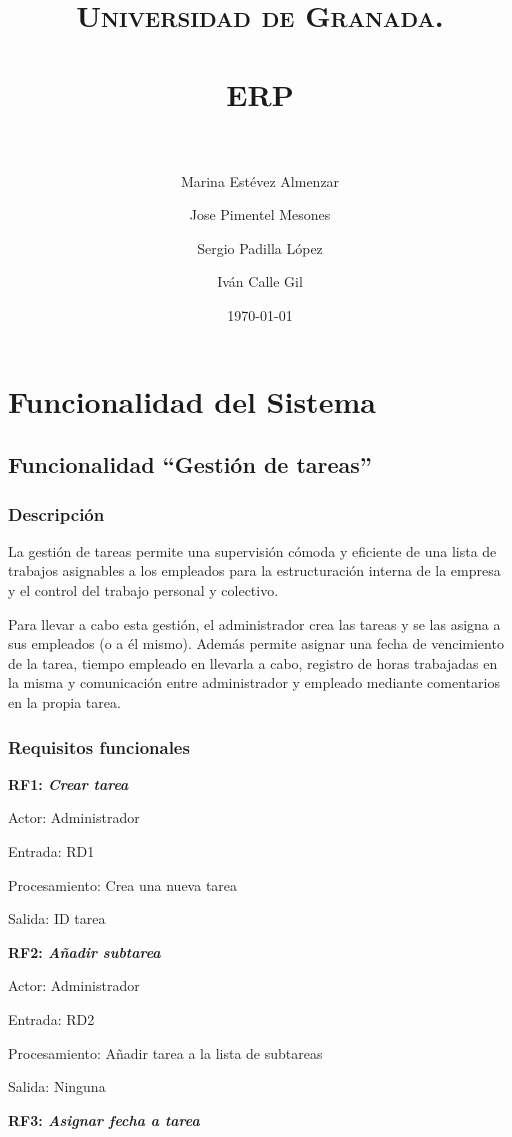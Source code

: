 \documentclass[paper=a4, fontsize=11pt, spanish]{scrartcl}
\title{
  \normalfont \normalsize
  \textsc{Universidad de Granada.} \\ [25pt]
  \horrule{0.5pt} \\[0.4cm]
  \huge ERP \\
  \horrule{2pt} \\[0.5cm]
}
\author{Marina Estévez Almenzar\\
\and
Jose Pimentel Mesones\\
\and
Sergio Padilla López\\
\and
Iván Calle Gil\\}
\date{\normalsize\today}
\begin{document}
\maketitle
\newpage

\section{Funcionalidad del Sistema}

\subsection{Funcionalidad “Gestión de tareas”}

\subsubsection{Descripción}
\setlength{\parindent}{3em} La gestión de tareas permite una supervisión cómoda y eficiente de una lista de trabajos asignables a los empleados para la estructuración interna de la empresa y el control del trabajo personal y colectivo.

	Para llevar a cabo esta gestión, el administrador crea las tareas y se las asigna a sus empleados (o a él mismo). Además permite asignar una fecha de vencimiento de la tarea, tiempo empleado en llevarla a cabo, registro de horas trabajadas en la misma y comunicación entre administrador y empleado mediante comentarios en la propia tarea.

\subsubsection{Requisitos funcionales}
\setlength{\parindent}{0em}
\textbf{RF1: \textit{Crear tarea}}
\setlength{\parindent}{2em}

Actor: Administrador

Entrada: RD1

Procesamiento: Crea una nueva tarea

Salida: ID tarea

\setlength{\parindent}{0em}
\textbf{RF2: \textit{Añadir subtarea}}
\setlength{\parindent}{2em}

Actor: Administrador

Entrada: RD2

Procesamiento: Añadir tarea a la lista de subtareas

Salida: Ninguna

\setlength{\parindent}{0em}
\textbf{RF3: \textit{Asignar fecha a tarea}}
\setlength{\parindent}{2em}
\end{document}
